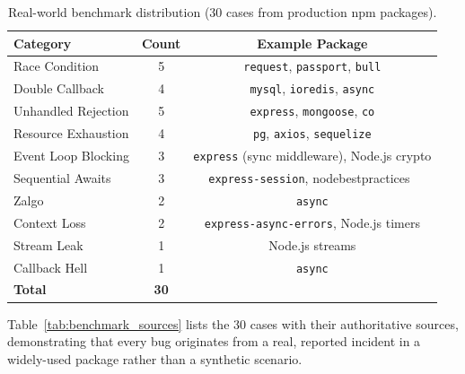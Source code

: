\documentclass[runningheads]{llncs}
\begin{document}
\begin{table}[H]
  \centering
  \caption{Real-world benchmark distribution (30 cases from production npm packages).}
  \label{tab:benchmark}
  \begin{tabular}{@{}lcc@{}}
    \toprule
    \textbf{Category} & \textbf{Count} & \textbf{Example Package} \\
    \midrule
    Race Condition      & 5  & \texttt{request}, \texttt{passport}, \texttt{bull} \\
    Double Callback     & 4  & \texttt{mysql}, \texttt{ioredis}, \texttt{async} \\
    Unhandled Rejection & 5  & \texttt{express}, \texttt{mongoose}, \texttt{co} \\
    Resource Exhaustion & 4  & \texttt{pg}, \texttt{axios}, \texttt{sequelize} \\
    Event Loop Blocking & 3  & \texttt{express} (sync middleware), Node.js crypto \\
    Sequential Awaits   & 3  & \texttt{express-session}, nodebestpractices~\cite{nodebestpractices} \\
    Zalgo               & 2  & \texttt{async} \\
    Context Loss        & 2  & \texttt{express-async-errors}, Node.js timers \\
    Stream Leak         & 1  & Node.js streams \\
    Callback Hell       & 1  & \texttt{async} \\
    \midrule
    \textbf{Total}      & \textbf{30} & \\
    \bottomrule
  \end{tabular}
\end{table}

Table~\ref{tab:benchmark_sources} lists the 30 cases with their authoritative
sources, demonstrating that every bug originates from a real, reported incident
in a widely-used package rather than a synthetic scenario.
\end{document}
